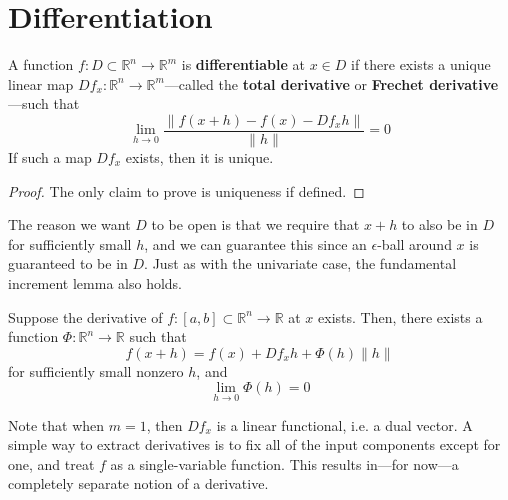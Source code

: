\section{Differentiation}

  \begin{definition}
    A function $f: D \subset \mathbb{R}^n \longrightarrow \mathbb{R}^m$ is \textbf{differentiable} at $x \in D$ if there exists a unique linear map $Df_x: \mathbb{R}^n \longrightarrow \mathbb{R}^m$---called the \textbf{total derivative} or \textbf{Frechet derivative}---such that 
    \begin{equation}
      \lim_{h \to 0} \frac{\| f(x + h) - f(x) - Df_x h \|}{\| h \|} = 0 
    \end{equation} 
    If such a map $D f_x$ exists, then it is unique. 
  \end{definition}
  \begin{proof}
    The only claim to prove is uniqueness if defined. 
  \end{proof} 

  The reason we want $D$ to be open is that we require that $x + h$ to also be in $D$ for sufficiently small $h$, and we can guarantee this since an $\epsilon$-ball around $x$ is guaranteed to be in $D$. Just as with the univariate case, the fundamental increment lemma also holds. 

  \begin{lemma}
    Suppose the derivative of $f: [a, b] \subset \mathbb{R}^n \to \mathbb{R}$ at $x$ exists. Then, there exists a function $\Phi: \mathbb{R}^n \to \mathbb{R}$ such that 
    \begin{equation}
      f(x + h) = f(x) + Df_x h + \Phi(h) \|h\|
    \end{equation}
    for sufficiently small nonzero $h$, and 
    \begin{equation}
      \lim_{h \to 0} \Phi(h) = 0
    \end{equation}
  \end{lemma}

  Note that when $m = 1$, then $Df_x$ is a linear functional, i.e. a dual vector. A simple way to extract derivatives is to fix all of the input components except for one, and treat $f$ as a single-variable function. This results in---for now---a completely separate notion of a derivative. 

